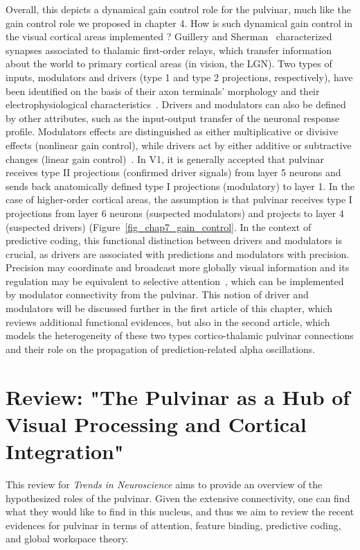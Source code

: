 Overall, this depicts a dynamical gain control role for the pulvinar, much like the gain control role we proposed in chapter 4. How is such dynamical gain control in the visual cortical areas implemented ? Guillery and Sherman~\cite{guillery2002thalamus} characterized synapses associated to thalamic first-order relays, which transfer information about the world to primary cortical areas (in vision, the \gls{LGN}). Two types of inputs, modulators and drivers (type 1 and type 2 projections, respectively), have been identified on the basis of their axon terminals’ morphology and their electrophysiological characteristics~\cite{sherman1998actions}. Drivers and modulators can also be defined by other attributes, such as the input-output transfer of the neuronal response profile. Modulators effects are distinguished as either multiplicative or divisive effects (nonlinear gain control), while drivers act by either additive or subtractive changes (linear gain control)~\cite{abbott2005drivers, silver2010neuronal}. In \gls{V1}, it is generally accepted that pulvinar receives type II projections (confirmed driver signals) from layer 5 neurons and sends back anatomically defined type I projections (modulatory) to layer 1. In the case of higher-order cortical areas, the assumption is that pulvinar receives type I projections from layer 6 neurons (suspected modulators) and projects to layer 4 (suspected drivers) (Figure~\ref{fig_chap7_gain_control}. In the context of predictive coding, this functional distinction between drivers and modulators is crucial, as drivers are associated with predictions and modulators with precision. Precision may coordinate and broadcast more globally visual information and its regulation may be equivalent to selective attention~\cite{creutzfeldt1988extrageniculo}, which can be implemented by modulator connectivity from the pulvinar. This notion of driver and modulators will be discussed further in the first article of this chapter, which reviews additional functional evidences, but also in the second article, which models the heterogeneity of these two types cortico-thalamic pulvinar connections and their role on the propagation of prediction-related alpha oscillations. 

\section{Review: "The Pulvinar as a Hub of Visual Processing and Cortical Integration"}
This review for \textit{Trends in Neuroscience} aims to provide an overview of the hypothesized roles of the pulvinar. Given the extensive connectivity, one can find what they would like to find in this nucleus, and thus we aim to review the recent evidences for pulvinar in terms of attention, feature binding, predictive coding, and global workspace theory. 

